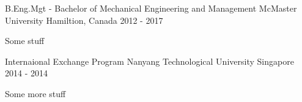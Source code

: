 

\begin{cventries}

  \cventry
    {B.Eng.Mgt - Bachelor of Mechanical Engineering and Management} %
    {McMaster University} %
    {Hamiltion, Canada} %
    {2012 - 2017} %
    {
      \begin{cvitems} %
        \item {Some stuff}
      \end{cvitems}
    }

  \cventry
    {Internaional Exchange Program} %
    {Nanyang Technological University} %
    {Singapore} %
    {2014 - 2014} %
    {
      \begin{cvitems} %
        \item {Some more stuff}
      \end{cvitems}
    }

\end{cventries}
